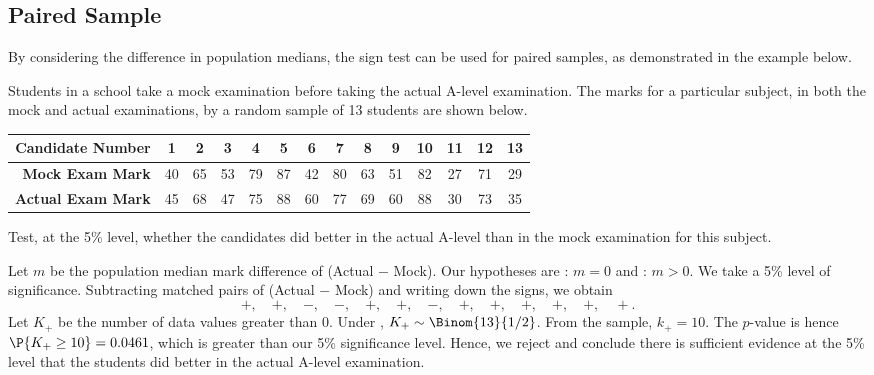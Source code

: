 \subsection{Paired Sample}

By considering the difference in population medians, the sign test can be used for paired samples, as demonstrated in the example below.

\begin{sample}
    Students in a school take a mock examination before taking the actual A-level examination. The marks for a particular subject, in both the mock and actual examinations, by a random sample of 13 students are shown below.

    \begin{table}[H]
        \centering
        \begin{tabular}{|r|c|c|c|c|c|c|c|c|c|c|c|c|c|}
            \hline
            \textbf{Candidate Number} & 1 & 2 & 3 & 4 & 5 & 6 & 7 & 8 & 9 & 10 & 11 & 12 & 13 \\ \hline
            \textbf{Mock Exam Mark} & 40 & 65 & 53 & 79 & 87 & 42 & 80 & 63 & 51 & 82 & 27 & 71 & 29 \\ \hline
            \textbf{Actual Exam Mark} & 45 & 68 & 47 & 75 & 88 & 60 & 77 & 69 & 60 & 88 & 30 & 73 & 35 \\ \hline
        \end{tabular}
    \end{table}

    Test, at the 5\% level, whether the candidates did better in the actual A-level than in the mock examination for this subject.
\end{sample}
\begin{sampans}
    Let $m$ be the population median mark difference of (Actual $-$ Mock). Our hypotheses are \nullhyp: $m = 0$ and \althyp: $m > 0$. We take a 5\% level of significance. Subtracting matched pairs of (Actual $-$ Mock) and writing down the signs, we obtain \[+, \quad +, \quad -, \quad -, \quad +, \quad +, \quad -, \quad +, \quad +, \quad +, \quad +, \quad +, \quad +.\] Let $K_+$ be the number of data values greater than 0. Under \nullhyp, $K_+ \sim \Binom{13}{1/2}$. From the sample, $k_+ = 10$. The $p$-value is hence $\P{K_+ \geq 10} = 0.0461$, which is greater than our 5\% significance level. Hence, we reject \nullhyp{} and conclude there is sufficient evidence at the 5\% level that the students did better in the actual A-level examination.
\end{sampans}

